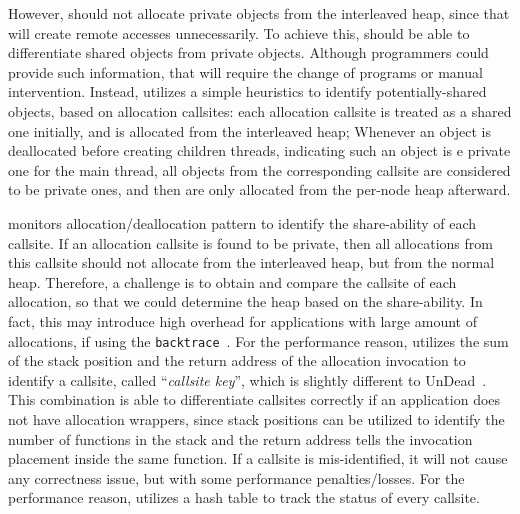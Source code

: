 However, \NA{} should not allocate private objects from the interleaved heap, since that will create remote accesses unnecessarily. To achieve this, \NM{} should be able to differentiate shared objects from private objects. Although programmers could provide such information, that will require the change of programs or manual intervention. Instead, \NM{} utilizes a simple heuristics to identify potentially-shared objects, based on allocation callsites: each allocation callsite is treated as a shared one initially, and is allocated from the interleaved heap; Whenever an object is deallocated before creating children threads, indicating such an object is e private one for the main thread,  all objects from the corresponding callsite are considered to be private ones, and then are only allocated from the per-node heap afterward. 

\NM{} monitors allocation/deallocation pattern to identify the share-ability of each callsite. If an allocation callsite is found to be private, then all allocations from this callsite should not allocate from the interleaved heap, but from the normal heap. Therefore, a challenge  is to obtain and compare the callsite of each allocation, so that we could determine the heap based on the share-ability. In fact, this may introduce high overhead for applications with large amount of allocations, if using the \texttt{backtrace}~\citep{DBLP:conf/icse/SumnerZWZ10, DBLP:conf/cgo/ZengR0AJ014}. For the performance reason, \NA{} utilizes the sum of the stack position and the return address of the allocation invocation to identify a callsite, called ``\textit{callsite key}'',  which is slightly different to UnDead~\citep{UnDead}. This combination is able to differentiate callsites correctly if an application does not have allocation wrappers, since stack positions can be utilized to identify the number of functions in the stack and the return address tells the invocation placement inside the same function. If a callsite is mis-identified, it will not cause any correctness issue, but with some performance penalties/losses. For the performance reason, \NA{} utilizes a hash table to track the status of every callsite. 
 
